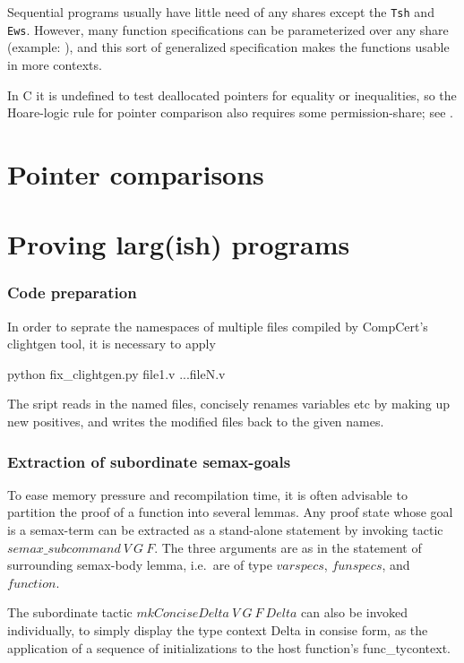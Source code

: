 \documentclass[12pt,fleqn,openany,oneside,showtrims]{memoir}
\begin{document}
Sequential programs usually have little need of any shares except
the \lstinline{Tsh} and \lstinline{Ews}.  However, many function 
specifications can be parameterized over any share (example: ), and this sort
of generalized specification makes the functions usable in more contexts.

In C it is undefined to test deallocated pointers for equality or inequalities,
so the Hoare-logic rule for pointer comparison also requires some
permission-share; see .


\chapter{Pointer comparisons}

\chapter{Proving larg(ish) programs}

\subsection{Code preparation}
In order to seprate the namespaces of multiple files compiled by CompCert's clightgen tool, it is necessary to apply

python fix\_clightgen.py file1.v ...fileN.v

The sript reads in the named files, concisely renames variables etc by
making up new positives, and writes the modified files back to the
given names.

\subsection{Extraction of subordinate semax-goals}
To ease memory pressure and recompilation time, it is often advisable
to partition the proof of a function into several lemmas. Any proof
state whose goal is a semax-term can be extracted as a stand-alone
statement by invoking tactic $\mathit{semax\_subcommand}\ V\ G\ F$.
The three arguments are as in the statement of surrounding semax-body
lemma, i.e.~are of type $\mathit{varspecs}$, $\mathit{funspecs}$, and
$\mathit{function}$. 

The subordinate tactic $\mathit{mkConciseDelta}\ V\ G\ F\ \mathit{Delta}$ can
also be invoked individually, to simply display the type context Delta
in consise form, as the application of a sequence of initializations
to the host function's func\_tycontext.
\end{document}
